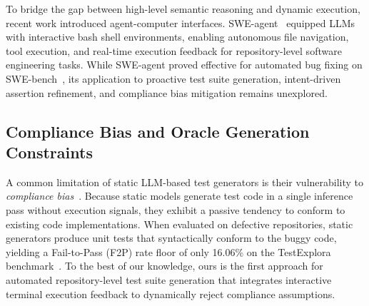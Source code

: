 To bridge the gap between high-level semantic reasoning and dynamic execution, recent work introduced agent-computer interfaces. SWE-agent~\cite{sweagent} equipped LLMs with interactive bash shell environments, enabling autonomous file navigation, tool execution, and real-time execution feedback for repository-level software engineering tasks. While SWE-agent proved effective for automated bug fixing on SWE-bench~\cite{swebench}, its application to proactive test suite generation, intent-driven assertion refinement, and compliance bias mitigation remains unexplored.

\subsection{Compliance Bias and Oracle Generation Constraints}
A common limitation of static LLM-based test generators is their vulnerability to \textit{compliance bias}~\cite{testexplora}. Because static models generate test code in a single inference pass without execution signals, they exhibit a passive tendency to conform to existing code implementations. When evaluated on defective repositories, static generators produce unit tests that syntactically conform to the buggy code, yielding a Fail-to-Pass (F2P) rate floor of only 16.06\% on the TestExplora benchmark~\cite{testexplora}. To the best of our knowledge, ours is the first approach for automated repository-level test suite generation that integrates interactive terminal execution feedback to dynamically reject compliance assumptions.
